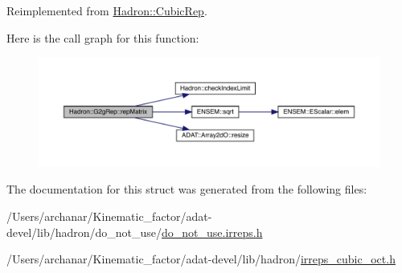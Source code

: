 Reimplemented from \mbox{\hyperlink{structHadron_1_1CubicRep_ac5d7e9e6f4ab1158b5fce3e4ad9e8005}{Hadron\+::\+Cubic\+Rep}}.

Here is the call graph for this function\+:
\nopagebreak
\begin{figure}[H]
\begin{center}
\leavevmode
\includegraphics[width=350pt]{d9/d3e/structHadron_1_1G2gRep_af178c31ae966d7c1025673a0889b7f6f_cgraph}
\end{center}
\end{figure}


The documentation for this struct was generated from the following files\+:\begin{DoxyCompactItemize}
\item 
/\+Users/archanar/\+Kinematic\+\_\+factor/adat-\/devel/lib/hadron/do\+\_\+not\+\_\+use/\mbox{\hyperlink{adat-devel_2lib_2hadron_2do__not__use_2do__not__use_8irreps_8h}{do\+\_\+not\+\_\+use.\+irreps.\+h}}\item 
/\+Users/archanar/\+Kinematic\+\_\+factor/adat-\/devel/lib/hadron/\mbox{\hyperlink{adat-devel_2lib_2hadron_2irreps__cubic__oct_8h}{irreps\+\_\+cubic\+\_\+oct.\+h}}\end{DoxyCompactItemize}
